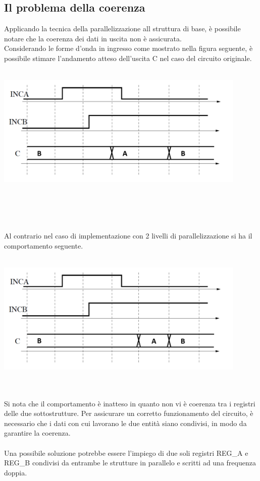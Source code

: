 \documentclass[11pt,  english, makeidx, a4paper, titlepage, oneside]{book}
\begin{document}
\subsection{Il problema della coerenza}
Applicando la tecnica della parallelizzazione all struttura di base, è possibile notare che la coerenza dei dati in uscita non è assicurata.
\\
Considerando le forme d'onda in ingresso come mostrato nella figura seguente, è possibile stimare l'andamento atteso dell'uscita C nel caso del circuito originale.
\\\\
\centerline{\includegraphics[width=12cm]{./img/Lab_3/Comportamento_atteso.png}}
\\\\\\\\
Al contrario nel caso di implementazione con 2 livelli di parallelizzazione si ha il comportamento seguente.
\\\\
\centerline{\includegraphics[width=12cm]{./img/Lab_3/Comportamento_attuale.png}}
\\\\
Si nota che il comportamento è inatteso in quanto non vi è coerenza tra i registri delle due sottostrutture. Per assicurare un corretto funzionamento del circuito, è necessario che i dati con cui lavorano le due entità siano condivisi, in modo da garantire la coerenza.
\\\\
Una possibile soluzione potrebbe essere l'impiego di due soli registri REG\_A e REG\_B condivisi da entrambe le strutture in parallelo e scritti ad una frequenza doppia.
\end{document}

